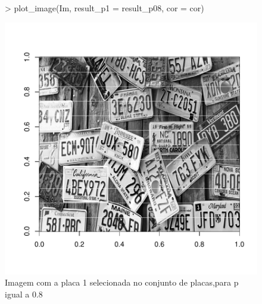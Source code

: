 \documentclass[12pt]{article}
\begin{document}
\begin{figure}
\centering
\begin{Schunk}
\begin{Sinput}
> plot_image(Im, result_p1 = result_p08, cor = cor)
\end{Sinput}
\end{Schunk}
\includegraphics{template_matching-012}
\caption{Imagem com a placa 1 selecionada no conjunto de placas,para p igual a 0.8}
\label{placa1selecionada}
\end{figure}
\end{document}
